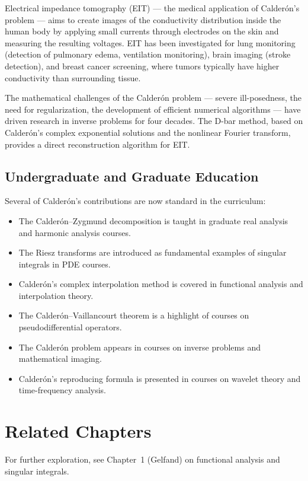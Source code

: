 Electrical impedance tomography (EIT) --- the medical application of Calder\'{o}n's problem --- aims to create images of the conductivity distribution inside the human body by applying small currents through electrodes on the skin and measuring the resulting voltages. EIT has been investigated for lung monitoring (detection of pulmonary edema, ventilation monitoring), brain imaging (stroke detection), and breast cancer screening, where tumors typically have higher conductivity than surrounding tissue.

The mathematical challenges of the Calder\'{o}n problem --- severe ill-posedness, the need for regularization, the development of efficient numerical algorithms --- have driven research in inverse problems for four decades. The D-bar method, based on Calder\'{o}n's complex exponential solutions and the nonlinear Fourier transform, provides a direct reconstruction algorithm for EIT.

\subsection{Undergraduate and Graduate Education}

Several of Calder\'{o}n's contributions are now standard in the curriculum:
\begin{itemize}
    \item The Calder\'{o}n--Zygmund decomposition is taught in graduate real analysis and harmonic analysis courses.
    \item The Riesz transforms are introduced as fundamental examples of singular integrals in PDE courses.
    \item Calder\'{o}n's complex interpolation method is covered in functional analysis and interpolation theory.
    \item The Calder\'{o}n--Vaillancourt theorem is a highlight of courses on pseudodifferential operators.
    \item The Calder\'{o}n problem appears in courses on inverse problems and mathematical imaging.
    \item Calder\'{o}n's reproducing formula is presented in courses on wavelet theory and time-frequency analysis.
\end{itemize}

\section{Related Chapters}
For further exploration, see Chapter~1 (Gelfand) on functional analysis and singular integrals.

